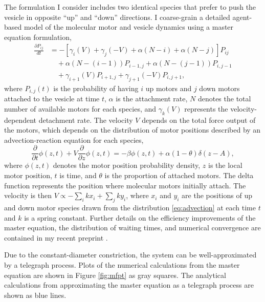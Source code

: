 \documentclass[a4paper,11pt]{article}
\newcommand{\pa}{\partial}
\begin{document}
    The formulation I consider includes two identical species that prefer to push the vesicle in opposite ``up'' and ``down'' directions. I coarse-grain a detailed agent-based model of the molecular motor and vesicle dynamics using a master equation formulation,
    \begin{equation*}
        \begin{split}
            \frac{\pa P_{ij}}{dt} &= -\left[\gamma_i(V) + \gamma_j(-V) + \alpha (N - i) + \alpha( N - j)\right]P_{ij}\\
            &\quad + \alpha(N - (i-1)) P_{i-1,j} + \alpha (N - (j-1)) P_{i,j-1}\\
            &\quad + \gamma_{i+1}(V)P_{i+1,j} + \gamma_{j+1}(-V)P_{i,j+1},
        \end{split}
    \end{equation*}
    where $P_{i,j}(t)$ is the probability of having $i$ up motors and $j$ down motors attached to the vesicle at time $t$, $\alpha$ is the attachment rate, $N$ denotes the total number of available motors for each species, and $\gamma_k(V)$ represents the velocity-dependent detachment rate. The velocity $V$ depends on the total force output of the motors, which depends on the distribution of motor positions described by an advection-reaction equation for each species,
    \begin{equation}\label{eq:advection}
        \frac{\pa}{\pa t}\phi\left(z,t\right) + V\frac{\pa}{\pa z}\phi\left(z,t\right) = -\beta \phi(z,t) + \alpha(1-\theta)\delta(z-A),
    \end{equation}
	where $\phi(z,t)$ denotes the motor position probability density, $z$ is the local motor position, $t$ is time, and $\theta$ is the proportion of attached motors. The delta function represents the position where molecular motors initially attach. The velocity is then $V \propto -\sum_i k x_i  + \sum_j k y_i$, where $x_i$ and $y_i$ are the positions of up and down motor species drawn from the distribution \eqref{eq:advection} at each time $t$ and $k$ is a spring constant. Further details on the efficiency improvements of the master equation, the distribution of waiting times, and numerical convergence are contained in my recent preprint \cite{park2021coarse}.
    
    Due to the constant-diameter constriction, the system can be well-approximated by a telegraph process. Plots of the numerical calculations from the master equation are shown in Figure \ref{fig:mfpt} as gray squares. The analytical calculations from approximating the master equation as a telegraph process are shown as blue lines.
    
\end{document}
